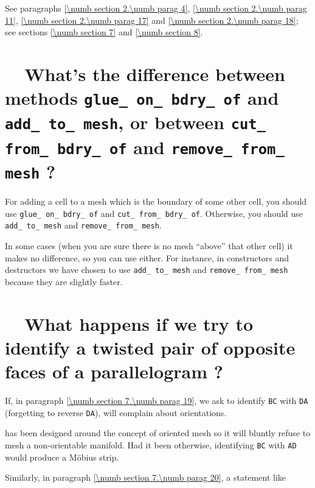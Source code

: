 See paragraphs \ref{\numb section 2.\numb parag 4}, \ref{\numb section 2.\numb parag 11},
\ref{\numb section 2.\numb parag 17} and \ref{\numb section 2.\numb parag 18};
see sections \ref{\numb section 7} and \ref{\numb section 8}.


\section{~~What's the difference between methods {\tt glue\_\,on\_\,bdry\_\,of} and
  {\tt add\_\,to\_\,mesh}, or between {\tt cut\_\,from\_\,bdry\_\,of} and
  {\tt remove\_\,from\_\,mesh} ?}
\label{\numb section 13.\numb parag 4}

For adding a cell to a mesh which is the boundary of some other cell,
you should use {\small\tt glue\_\,on\_\,bdry\_\,of} and {\small\tt cut\_\,from\_\,bdry\_\,of}.
Otherwise, you should use {\small\tt add\_\,to\_\,mesh} and {\small\tt remove\_\,from\_\,mesh}.

In some cases (when you are sure there is no mesh ``above'' that other cell)
it makes no difference, so you can use either.
For instance, in {\small\tt{}} constructors and destructors
we have chosen to use {\small\tt add\_\,to\_\,mesh} and {\small\tt remove\_\,from\_\,mesh}
because they are slightly faster.


\section{~~What happens if we try to identify a twisted pair of
           opposite faces of a parallelogram ?}
\label{\numb section 13.\numb parag 5}

If, in paragraph \ref{\numb section 7.\numb parag 19}, we ask {\maniFEM} to identify
{\small\tt BC} with {\small\tt DA} (forgetting to reverse {\small\tt DA}),
{\maniFEM} will complain about orientations.

\ManiFEM{} has been designed around the concept of oriented mesh so it will
bluntly refuse to mesh a non-orientable manifold.
Had it been otherwise, identifying {\small\tt BC} with {\small\tt AD}
would produce a M\"obius strip.

Similarly, in paragraph \ref{\numb section 7.\numb parag 20}, a statement like

